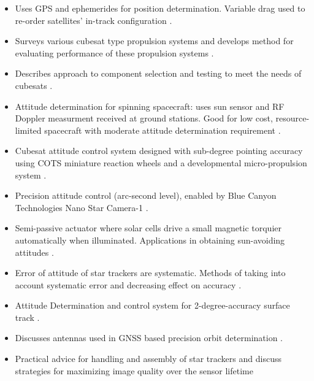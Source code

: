 %

\begin{itemize}
\item Uses GPS and ephemerides for position determination. Variable drag used to re-order satellites' in-track configuration \cite{Gangestad}.

\item Surveys various cubesat type propulsion systems and develops method for evaluating performance of these propulsion systems \cite{Spence}.

\item Describes approach to component selection and testing to meet the needs of cubesats \cite{Sinclair}.

\item Attitude determination for spinning spacecraft: uses sun sensor and RF Doppler measurment received at ground stations. Good for low cost, resource-limited spacecraft with moderate attitude determination requirement \cite{Tsuda}.

\item Cubesat attitude control system designed with sub-degree pointing accuracy using COTS miniature reaction wheels and a developmental micro-propulsion system \cite{Sanders}.

\item Precision attitude control (arc-second level), enabled by Blue Canyon Technologies Nano Star Camera-1 \cite{Palo}.

\item Semi-passive actuator where solar cells drive a small magnetic torquier automatically when illuminated. Applications in obtaining sun-avoiding attitudes \cite{Bonin}.

\item Error of attitude of star trackers are systematic. Methods of taking into account systematic error and decreasing effect on accuracy \cite{Tuchin}.

\item Attitude Determination and control system for 2-degree-accuracy surface track \cite{Aherne}.

\item Discusses antennas used in GNSS based precision orbit determination \cite{Zackrisson}.

\item Practical advice for handling and assembly of star trackers and discuss strategies for maximizing image quality over the sensor lifetime \cite{Enright}


\end{itemize}
